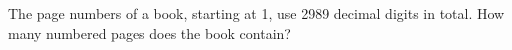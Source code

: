 The page numbers of a book, starting at 1, use 2989 decimal digits in total. How many numbered pages does the book contain?
